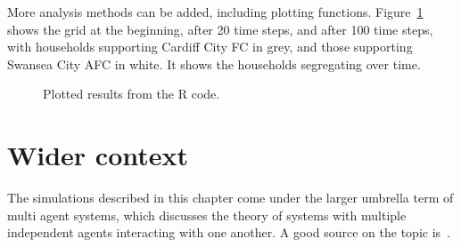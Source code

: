 More analysis methods can be added, including plotting functions.
Figure~\ref{fig:schelling_R_plot} shows the grid at the beginning, after 20
time steps, and after 100 time steps, with households supporting Cardiff City FC
in grey, and those supporting Swansea City AFC in white.
It shows the households segregating over time.

\begin{figure}
\begin{center}
\end{center}
\caption{Plotted results from the R code.}
\label{fig:schelling_R_plot}
\end{figure}

\section{Wider context}\label{sec:agent_based_simulation_wider_context}

The simulations described in this chapter come under the larger umbrella term of
multi agent systems, which discusses the theory of systems with multiple
independent agents interacting with one another. A good source on the topic
is~\parencite{shoham2008multiagent}.

